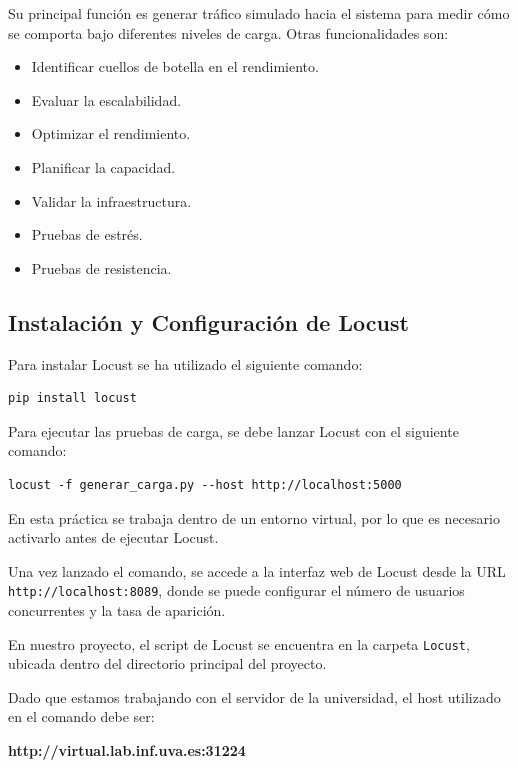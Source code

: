 \documentclass[10pt]{book}
\begin{document}
    Su principal función es generar tráfico simulado hacia el sistema para medir cómo se comporta bajo diferentes niveles de carga. Otras funcionalidades son:
        \begin{itemize}
            \item Identificar cuellos de botella en el rendimiento.
            \item Evaluar la escalabilidad.
            \item Optimizar el rendimiento.
            \item Planificar la capacidad.
            \item Validar la infraestructura.
            \item Pruebas de estrés.
            \item Pruebas de resistencia.
        \end{itemize}


\subsection{Instalación y Configuración de Locust} 

\cite{locust_video}Para instalar Locust se ha utilizado el siguiente comando:

\begin{lstlisting}[style=simplebash]
    pip install locust
\end{lstlisting}

Para ejecutar las pruebas de carga, se debe lanzar Locust con el siguiente comando:

\begin{lstlisting}[style=simplebash]
    locust -f generar_carga.py --host http://localhost:5000
\end{lstlisting}

En esta práctica se trabaja dentro de un entorno virtual, por lo que es necesario activarlo antes de ejecutar Locust.

Una vez lanzado el comando, se accede a la interfaz web de Locust desde la URL \texttt{http://localhost:8089}, donde se puede configurar el número de usuarios concurrentes y la tasa de aparición.

En nuestro proyecto, el script de Locust se encuentra en la carpeta \texttt{Locust}, ubicada dentro del directorio principal del proyecto. 

Dado que estamos trabajando con el servidor de la universidad, el host utilizado en el comando debe ser:

\begin{center}
\textbf{http://virtual.lab.inf.uva.es:31224}
\end{center}
\end{document}
